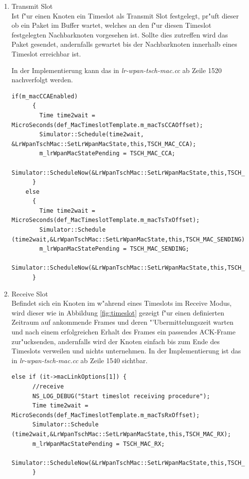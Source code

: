 \begin{enumerate}
  \item Transmit Slot \hfill \\
    Ist f"ur einen Knoten ein Timeslot als Transmit Slot festgelegt, pr"uft
    dieser ob ein Paket im Buffer wartet, welches an den f"ur diesen Timeslot
    festgelegten Nachbarknoten vorgesehen ist. Sollte dies zutreffen wird das
    Paket gesendet, andernfalls gewartet bis der Nachbarknoten innerhalb eines
    Timeslot erreichbar ist.

    In der Implementierung kann das in \textit{lr-wpan-tsch-mac.cc} ab Zeile 1520
    nachverfolgt werden.

    \begin{lstlisting}[frame=single]
    if(m_macCCAEnabled)
      {
        Time time2wait = MicroSeconds(def_MacTimeslotTemplate.m_macTsCCAOffset);
        Simulator::Schedule(time2wait, &LrWpanTschMac::SetLrWpanMacState,this,TSCH_MAC_CCA);
        m_lrWpanMacStatePending = TSCH_MAC_CCA;
        Simulator::ScheduleNow(&LrWpanTschMac::SetLrWpanMacState,this,TSCH_MAC_IDLE);
      }
    else
      {
        Time time2wait = MicroSeconds(def_MacTimeslotTemplate.m_macTsTxOffset);
        Simulator::Schedule (time2wait,&LrWpanTschMac::SetLrWpanMacState,this,TSCH_MAC_SENDING);
        m_lrWpanMacStatePending = TSCH_MAC_SENDING;
        Simulator::ScheduleNow(&LrWpanTschMac::SetLrWpanMacState,this,TSCH_MAC_IDLE);
      }
    \end{lstlisting}

  \item Receive Slot \hfill \\
    Befindet sich ein Knoten im w"ahrend eines Timeslots im Receive Modus, wird dieser
    wie in Abbildung \ref{fig:timeslot} gezeigt f"ur einen definierten Zeitraum
    auf ankommende Frames und deren "'Ubermittelungszeit warten und nach einem
    erfolgreichen Erhalt des Frames ein passendes ACK-Frame zur"ucksenden, andernfalls
    wird der Knoten einfach bis zum Ende des Timeslots verweilen und nichts unternehmen.
    In der Implementierung ist das in \textit{lr-wpan-tsch-mac.cc} ab Zeile 1540 sichtbar.

    \begin{lstlisting}[frame=single]
    else if (it->macLinkOptions[1]) {
      //receive
      NS_LOG_DEBUG("Start timeslot receiving procedure");
      Time time2wait = MicroSeconds(def_MacTimeslotTemplate.m_macTsRxOffset);
      Simulator::Schedule (time2wait,&LrWpanTschMac::SetLrWpanMacState,this,TSCH_MAC_RX);
      m_lrWpanMacStatePending = TSCH_MAC_RX;
      Simulator::ScheduleNow(&LrWpanTschMac::SetLrWpanMacState,this,TSCH_MAC_IDLE);
      }
    \end{lstlisting}
\end{enumerate}

